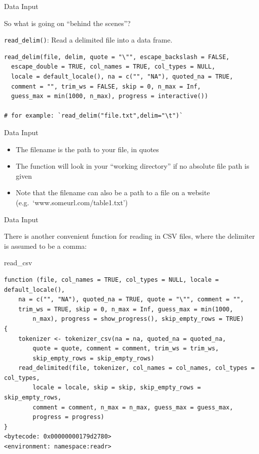 \documentclass[
  ignorenonframetext,
]{beamer}
\newenvironment{Shaded}{\begin{snugshade}}{\end{snugshade}}
\newcommand{\NormalTok}[1]{#1}
\providecommand{\tightlist}{%
  \setlength{\itemsep}{0pt}\setlength{\parskip}{0pt}}
\begin{document}
\begin{frame}[fragile]{Data Input}
\protect\hypertarget{data-input-5}{}

So what is going on ``behind the scenes''?

\texttt{read\_delim()}: Read a delimited file into a data frame.

\begin{verbatim}
read_delim(file, delim, quote = "\"", escape_backslash = FALSE,
  escape_double = TRUE, col_names = TRUE, col_types = NULL,
  locale = default_locale(), na = c("", "NA"), quoted_na = TRUE,
  comment = "", trim_ws = FALSE, skip = 0, n_max = Inf,
  guess_max = min(1000, n_max), progress = interactive())
           
# for example: `read_delim("file.txt",delim="\t")`
\end{verbatim}

\end{frame}

\begin{frame}{Data Input}
\protect\hypertarget{data-input-6}{}

\begin{itemize}
\tightlist
\item
  The filename is the path to your file, in quotes
\item
  The function will look in your ``working directory'' if no absolute
  file path is given
\item
  Note that the filename can also be a path to a file on a website
  (e.g.~`www.someurl.com/table1.txt')
\end{itemize}

\end{frame}

\begin{frame}[fragile]{Data Input}
\protect\hypertarget{data-input-7}{}

There is another convenient function for reading in CSV files, where the
delimiter is assumed to be a comma:

\begin{Shaded}
\begin{Highlighting}[]
\NormalTok{read_csv}
\end{Highlighting}
\end{Shaded}

\begin{verbatim}
function (file, col_names = TRUE, col_types = NULL, locale = default_locale(), 
    na = c("", "NA"), quoted_na = TRUE, quote = "\"", comment = "", 
    trim_ws = TRUE, skip = 0, n_max = Inf, guess_max = min(1000, 
        n_max), progress = show_progress(), skip_empty_rows = TRUE) 
{
    tokenizer <- tokenizer_csv(na = na, quoted_na = quoted_na, 
        quote = quote, comment = comment, trim_ws = trim_ws, 
        skip_empty_rows = skip_empty_rows)
    read_delimited(file, tokenizer, col_names = col_names, col_types = col_types, 
        locale = locale, skip = skip, skip_empty_rows = skip_empty_rows, 
        comment = comment, n_max = n_max, guess_max = guess_max, 
        progress = progress)
}
<bytecode: 0x00000000179d2780>
<environment: namespace:readr>
\end{verbatim}

\end{frame}
\end{document}
